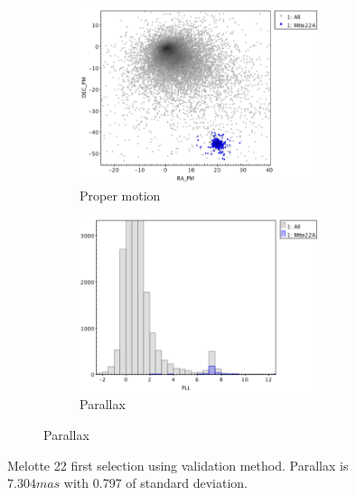 \documentclass[11pt, a4paper, english]{book}
\begin{document}
\begin{figure}[htbp]
  \centering
  \begin{subfigure}{0.9\textwidth}
    \centering
    \begin{subfigure}[t]{0.45\textwidth}
      \centering
      \includegraphics[width=\textwidth]{../figures/clusterix/topcat_prob_pm_melotte_22.png}
      \caption{Proper motion}
      \label{fig:topcat_prob_pm_melotte_22}
    \end{subfigure}
    \hfill
    \begin{subfigure}[t]{0.45\textwidth}
      \centering
      \includegraphics[width=\textwidth]{../figures/clusterix/topcat_prob_parallax_melotte_22.png}
      \caption{Parallax}
      \label{fig:topcat_prob_parallax_melotte_22}
    \end{subfigure}
  \end{subfigure}
  \caption{Melotte 22 first selection using validation method. Parallax is $7.304mas$ with 0.797 of standard deviation.}
  \label{fig:topcat_prob_selection_melotte_22}
\end{figure}
\end{document}
